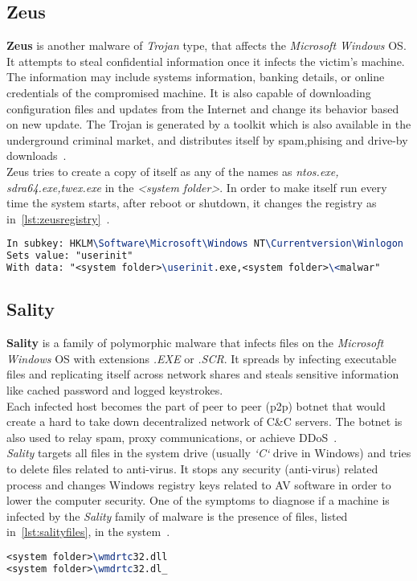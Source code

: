 \subsection{Zeus}
\label{sub:Zeus}
\textbf{Zeus} is another malware of \emph{Trojan} type, that affects the \emph{Microsoft Windows} OS\@.
It attempts to steal confidential information once it infects the victim's machine.
The information may include systems information, banking details, or online credentials of the compromised machine.
It is also capable of downloading configuration files and updates from the Internet and change its behavior based on new update.
The Trojan is generated by a toolkit which is also available in the underground criminal market, and distributes itself by spam,phising and drive-by downloads~\cite[Trojan.Zbot]{zeus}.\\
Zeus tries to create a copy of itself as any of the names as \emph{ntos.exe, sdra64.exe,twex.exe} in the \textit{<system folder>}.
In order to make itself run every time the system starts, after reboot or shutdown, it changes the registry as in~\autoref{lst:zeusregistry}~\cite[Win32/Zbot]{zeusmicro}.
\begin{lstlisting}[numbers=none,language=TeX,caption={Registry key modified by Zeus Trojan to autostart},label={lst:zeusregistry}]
In subkey: HKLM\Software\Microsoft\Windows NT\Currentversion\Winlogon
Sets value: "userinit"
With data: "<system folder>\userinit.exe,<system folder>\<malwar"
\end{lstlisting}
\subsection{Sality}
\label{sub:Sality}
\textbf{Sality} is a family of polymorphic malware that infects files on the \emph{Microsoft Windows} OS with extensions \emph{.EXE} or \emph{.SCR}.
It spreads by infecting executable files and replicating itself across network shares and steals sensitive information like cached password and logged keystrokes.\\
Each infected host becomes the part of peer to peer (p2p) botnet that would create a hard to take down decentralized network of C\&C servers.
The botnet is also used to relay spam, proxy communications, or achieve DDoS~\cite[Sality]{salitysym}.\\
\emph{Sality} targets all files in the system drive (usually \emph{`C`} drive in Windows) and tries to delete files related to anti-virus.
It stops any security (anti-virus) related process  and changes Windows registry keys related to AV software in order to lower the computer security.
One of the symptoms to diagnose if a machine is infected by the \emph{Sality} family of malware is the presence of files, listed in~\autoref{lst:salityfiles}, in the system~\cite[Win32/Sality]{salitymicro}.
\begin{lstlisting}[numbers=none,language=TeX,caption={Files created by Sality in the infected machine},label={lst:salityfiles}]
<system folder>\wmdrtc32.dll
<system folder>\wmdrtc32.dl_
\end{lstlisting}
